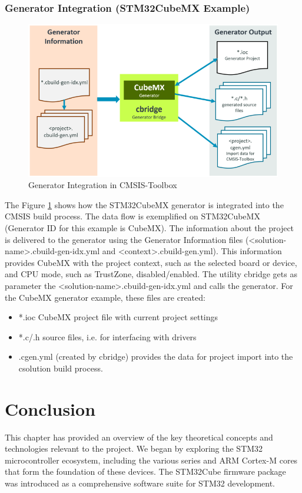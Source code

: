 \subsubsection{Generator Integration (STM32CubeMX Example)}
\begin{figure}[H]
	\centering
	\includegraphics[width=15cm]{img/Generator-Integration.png}
	\caption{Generator Integration in CMSIS-Toolbox}
	\label{fig:generator}
\end{figure}
The Figure \ref{fig:generator} shows how the STM32CubeMX generator is integrated into the CMSIS build process. The data flow is exemplified on STM32CubeMX (Generator ID for this example is CubeMX). The information about the project is delivered to the generator using the Generator Information files (<solution-name>.cbuild-gen-idx.yml and <context>.cbuild-gen.yml). This information provides CubeMX with the project context, such as the selected board or device, and CPU mode, such as TrustZone, disabled/enabled.
The utility cbridge gets as parameter the <solution-name>.cbuild-gen-idx.yml and calls the generator. For the CubeMX generator example, these files are created:
\begin{itemize}
	\item *.ioc CubeMX project file with current project settings
	\item *.c/.h source files, i.e. for interfacing with drivers
	\item <project-name>.cgen.yml (created by cbridge) provides the data for project import into the csolution build process.
\end{itemize}
\newpage


\section*{Conclusion}
This chapter has provided an overview of the key theoretical concepts and technologies relevant to the project. We began by exploring the STM32 microcontroller ecosystem, including the various series and ARM Cortex-M cores that form the foundation of these devices. The STM32Cube firmware package was introduced as a comprehensive software suite for STM32 development.

